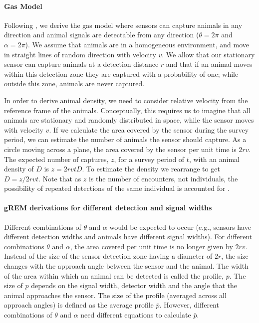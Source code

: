 \paragraph{Gas Model}

Following \cite{yapp1956theory}, we derive the gas model where sensors can capture animals in any direction and animal signals are detectable from any direction ($\theta =  2\pi$ and $ \alpha =  2\pi$).
We assume that animals are in a homogeneous environment, and move in straight lines of random direction with velocity $v$.
We allow that our stationary sensor can capture animals at a detection distance $r$ and that if an animal moves within this detection zone they are captured with a probability of one; while outside this zone, animals are never captured.

In order to derive animal density, we need to consider relative velocity from the reference frame of the animals.
Conceptually, this requires us to imagine that all animals are stationary and randomly distributed in space, while the sensor moves with velocity $v$.
If we calculate the area covered by the sensor during the survey period, we can estimate the number of animals the sensor should capture.
As a circle moving across a plane, the area covered by the sensor per unit time is $2rv$.
The expected number of captures, $z$, for a survey period of $t$, with an animal density of $D$ is $z = 2rvtD$.
To estimate the density we rearrange to get $D = z/2rvt$.
Note that as $z$ is the number of encounters, not individuals, the possibility of repeated detections of the same individual is accounted for \cite{Hutchinson_Waser_2007}.


\paragraph{gREM derivations for different detection and signal widths}
Different combinations of $\theta$ and $\alpha$ would be expected to occur (e.g., sensors have different detection widths and animals have different signal widths).
For different combinations $\theta$ and $\alpha$, the area covered per unit time is no longer given by $2rv$.
Instead of the size of the sensor detection zone having a diameter of $2r$, the size changes with the approach angle between the sensor and the animal.
The width of the area within which an animal can be detected is called the profile, $p$.
The size of $p$ depends on the signal width, detector width and the angle that the animal approaches the sensor.
The size of the profile (averaged across all approach angles) is defined as the average profile $\bar{p}$.
However, different combinations of $\theta$ and $\alpha$ need different equations to calculate $\bar{p}$. 




